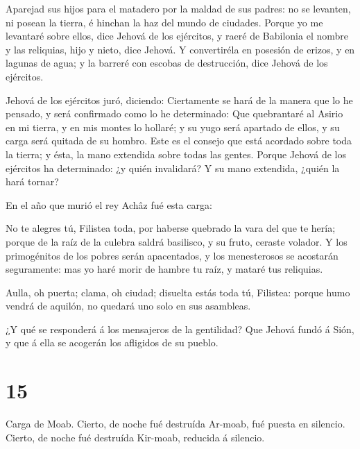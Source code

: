  Aparejad sus hijos para el matadero por la maldad de sus
padres: no se levanten, ni posean la tierra, é hinchan la haz del mundo
de ciudades.  Porque yo me levantaré sobre ellos, dice
Jehová de los ejércitos, y raeré de Babilonia el nombre y las reliquias,
hijo y nieto, dice Jehová.  Y convertiréla en posesión de
erizos, y en lagunas de agua; y la barreré con escobas de destrucción,
dice Jehová de los ejércitos.

 Jehová de los ejércitos juró, diciendo: Ciertamente se
hará de la manera que lo he pensado, y será confirmado como lo he
determinado:  Que quebrantaré al Asirio en mi tierra, y en
mis montes lo hollaré; y su yugo será apartado de ellos, y su carga será
quitada de su hombro.  Este es el consejo que está acordado
sobre toda la tierra; y ésta, la mano extendida sobre todas las gentes.
 Porque Jehová de los ejércitos ha determinado: ¿y quién
invalidará? Y su mano extendida, ¿quién la hará tornar?

 En el año que murió el rey Achâz fué esta carga:

 No te alegres tú, Filistea toda, por haberse quebrado la
vara del que te hería; porque de la raíz de la culebra saldrá basilisco,
y su fruto, ceraste volador.  Y los primogénitos de los
pobres serán apacentados, y los menesterosos se acostarán seguramente:
mas yo haré morir de hambre tu raíz, y mataré tus reliquias.

 Aulla, oh puerta; clama, oh ciudad; disuelta estás toda
tú, Filistea: porque humo vendrá de aquilón, no quedará uno solo en sus
asambleas.

 ¿Y qué se responderá á los mensajeros de la gentilidad?
Que Jehová fundó á Sión, y que á ella se acogerán los afligidos de su
pueblo.

\hypertarget{section-14}{%
\section{15}\label{section-14}}

 Carga de Moab. Cierto, de noche fué destruída Ar-moab, fué
puesta en silencio. Cierto, de noche fué destruída Kir-moab, reducida á
silencio.

